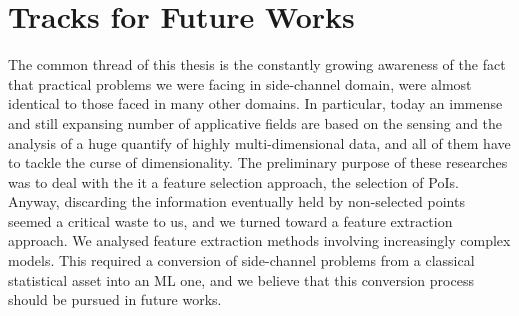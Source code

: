 \section{Tracks for Future Works}

The common thread of this thesis is the constantly growing awareness of the fact that practical problems we were facing in side-channel domain, were almost identical to those faced in many other domains. In particular, today an immense and still expansing number of applicative fields are based on the sensing and the analysis of a huge quantify of highly multi-dimensional data, and all of them have to tackle the curse of dimensionality. The preliminary purpose of these researches was to deal with the it \via a feature selection approach, \ie the selection of PoIs. Anyway, discarding the information eventually held by non-selected points seemed a critical waste to us, and we turned toward a feature extraction approach. We analysed feature extraction methods involving increasingly complex models. This required a conversion of side-channel problems from a classical statistical asset into an ML one, and we believe that this conversion process should be pursued in future works.\\




